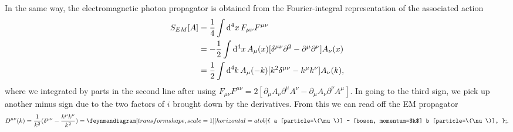 In the same way, the electromagnetic photon propagator is obtained from the Fourier-integral representation of the associated action
\begin{align}
  S_{EM} [A] &= \frac{1}{4} \int \dd[4]{x} F_{\mu\nu} F^{\mu\nu} \\
	     &= -\frac{1}{2} \int \dd[4]{x} A_{\mu}(x) [\delta^{\mu\nu} \partial^2 - \partial^{\mu} \partial^{\nu}] A_{\nu}(x) \\
	  &= \frac{1}{2} \int \bdd[4]{k} A_{\mu}(-k) [k^2 \delta^{\mu\nu} - k^{\mu} k^{\nu}] A_{\nu}(k),
	  \label{eq:15-ft}
\end{align}
where we integrated by parts in the second line after using $F_{\mu\nu} F^{\mu\nu} = 2 [\partial_{\mu} A_{\nu} \partial^{\mu} A^{\nu} - \partial_{\mu} A_{\nu} \partial^{\nu} A^{\mu}]$.
In going to the third sign, we pick up another minus sign due to the two factors of $i$ brought down by the derivatives.
From this we can read off the EM propagator
\begin{equation}
  \label{eq:15-prop}
  D^{\mu\nu}(k) = \frac{1}{k^2} (\delta^{\mu\nu} - \frac{k^{\mu} k^{\nu}}{k^2}) = 
  \begin{gathered}
    \feynmandiagram[transform shape, scale=1][horizontal=a to b] {
      a [particle=\(\mu\)] -- [boson, momentum=$k$] b [particle=\(\nu\)],
    };
  \end{gathered}.
\end{equation}
